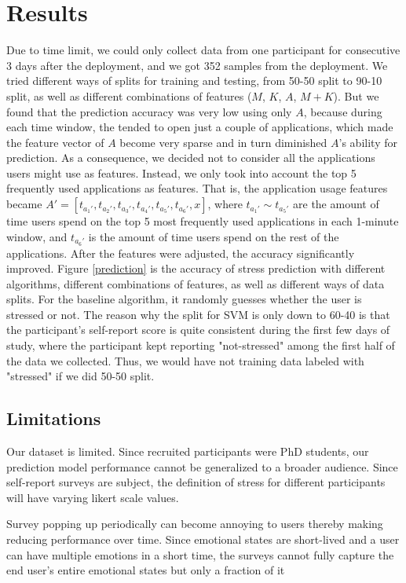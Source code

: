 \documentclass{article}
\begin{document}
\section{Results}
Due to time limit, we could only collect data from one participant for consecutive 3 days after the deployment, and we got 352 samples from the deployment. We tried different ways of splits for training and testing, from 50-50 split to 90-10 split, as well as different combinations of features ($M$, $K$, $A$, $M+K$). But we found that the prediction accuracy was very low using only $A$, because during each time window, the tended to open just a couple of applications, which made the feature vector of $A$ become very sparse and in turn diminished $A$'s ability for prediction. As a consequence, we decided not to consider all the applications users might use as features. Instead, we only took into account the top 5 frequently used applications as features. That is, the application usage features became $A'=[t_{a_1'}, t_{a_2'}, t_{a_3'}, t_{a_4'}, t_{a_5'}, t_{a_6'}, x]$, where $t_{a_1'}\sim t_{a_5'}$ are the amount of time users spend on the top 5 most frequently used applications in each 1-minute window, and $t_{a_6'}$ is the amount of time users spend on the rest of the applications. After the features were adjusted, the accuracy significantly improved. Figure \ref{prediction} is the accuracy of stress prediction with different algorithms, different combinations of features, as well as different ways of data splits. For the baseline algorithm, it randomly guesses whether the user is stressed or not. The reason why the split for SVM is only down to 60-40 is that the participant's self-report score is quite consistent during the first few days of study, where the participant kept reporting "not-stressed" among the first half of the data we collected. Thus, we would have not training data labeled with "stressed" if we did 50-50 split.


\subsection{Limitations}
Our dataset is limited. Since recruited participants were PhD students, our prediction model performance cannot be generalized to a broader audience. Since self-report surveys are subject, the definition of stress for different participants will have varying likert scale values. 

Survey popping up periodically can become annoying to users thereby making reducing performance over time. Since emotional states are short-lived and a user can have multiple emotions in a short time, the surveys cannot fully capture the end user's entire emotional states but only a fraction of it
\end{document}
